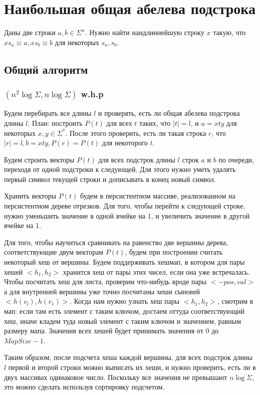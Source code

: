 \section{Наибольшая общая абелева подстрока}
Даны две строки $a, b \in \Sigma^n$. Нужно найти наидлиннейшую строку $x$ такую, что $xs_a \equiv a, xs_b \equiv b$ для некоторых $s_a, s_b$.

\subsection{Общий алгоритм}
{

\subsubsection{$(n^2 \log \Sigma, n \log \Sigma)$ w.h.p}

Будем перебирать все длины $l$ и проверять, есть ли общая абелева подстрока длины $l$.
План: построить $P(t)$ для всех $t$ таких, что $|t|=l$, и $a=xty$ для некоторых $x, y \in \Sigma^*$. После этого проверить, есть ли такая строка $r$, что $|r|=l, b=xty, P(r)=P(t)$ для некоторого $t$.

Будем строить векторы $P(t)$ для всех подстрок длины $l$ строк $a$ и $b$ по очереди, переходя от одной подстроки к следующей. Для этого нужно уметь удалять первый символ текущей строки и дописывать в конец новый символ.

Хранить векторы $P(t)$ будем в персистентном массиве, реализованном на персистентном дереве отрезков. Для того, чтобы перейти к следующей строке, нужно уменьшить значение в одной ячейке на 1, и увеличить значение в другой ячейке на 1.

Для того, чтобы научиться сравнивать на равенство две вершины дерева, соответствующие двум векторам $P(t)$, будем при построении считать некоторый хеш от вершины. Будем поддерживать хешмап, в котором для пары хешей $<h_1, h_2>$ хранится хеш от пары этих чисел, если она уже встречалась. Чтобы посчитать хеш для листа, проверим что-нибудь вроде пары $<-pos, val>$ а для внутренней вершины уже точно посчитаны хеши сыновей $<h(v_l), h(v_r)>$. Когда нам нужно узнать хеш пары $<h_1, h_2>$, смотрим в мап: если там есть элемент с таким ключом, достаем оттуда соответствующий хеш, иначе кладем туда новый элемент с таким ключом и значением, равным размеру мапа. Значения всех хешей будет принимать значения от $0$ до $MapSize - 1$.

Таким образом, после подсчета хеша каждой вершины, для всех подстрок длины $l$ первой и второй строки можно выписать их хеши, и нужно проверить, есть ли в двух массивах одинаковое число. Поскольку все значения не превышают $n \log \Sigma$, это можно сделать используя сортировку подсчетом.

}
